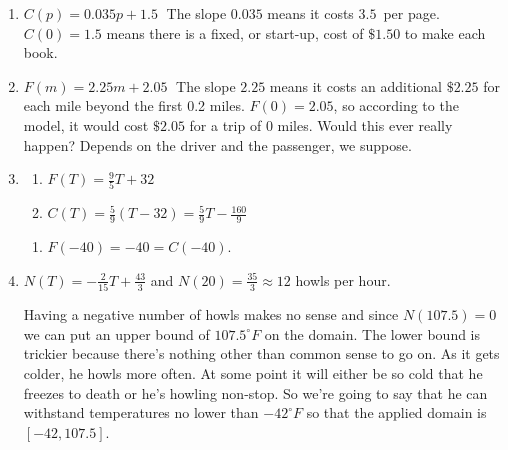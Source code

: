 \documentclass{ximera}
\begin{document}
\begin{enumerate}
\setcounter{enumi}{\value{HW}}

\item  $C(p) = 0.035p + 1.5 \;$  The slope $0.035$ means it costs $3.5$\textcent \, per page.  $C(0) = 1.5$ means there is a fixed, or start-up, cost of $\$1.50$ to make each book.

\item $F(m) = 2.25m + 2.05 \;$  The slope $2.25$ means it costs an additional $\$2.25$ for each mile beyond the first 0.2 miles.  $F(0) = 2.05$, so according to the model, it would cost $\$2.05$ for a trip of $0$ miles.  Would this ever really happen?  Depends on the driver and the passenger, we suppose.


\item   \begin{multicols}{2}

\begin{enumerate}

\item $F(T) = \frac{9}{5}T + 32$
\item $C(T) = \frac{5}{9}(T - 32) = \frac{5}{9}T - \frac{160}{9}$

\setcounter{HWindent}{\value{enumii}}

\end{enumerate}

\end{multicols}

\begin{enumerate}
\setcounter{enumii}{\value{HWindent}}

\item $F(-40) = -40 = C(-40)$.

\end{enumerate}



\item $N(T) = -\frac{2}{15}T + \frac{43}{3}$  and $N(20) = \frac{35}{3} \approx 12$ howls per hour.

Having a negative number of howls makes no sense and since $N(107.5) = 0$ we can put an upper bound of $107.5^{\circ}F$ on the domain.  The lower bound is trickier because there's nothing other than common sense to go on.  As it gets colder, he howls more often.  At some point it will either be so cold that he freezes to death or he's howling non-stop.  So we're going to say that he can withstand temperatures no lower than $-42^{\circ}F$ so that the applied domain is $[-42, 107.5]$.


\end{enumerate}
\end{document}
